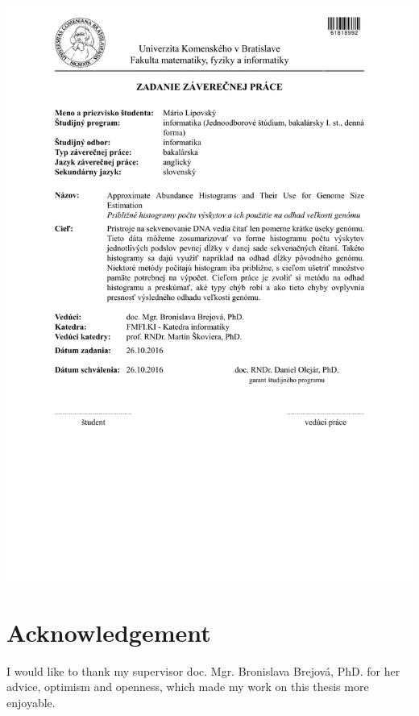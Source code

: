 \documentclass[12pt, oneside]{book}
\begin{document}
\newpage 
\thispagestyle{empty}
\hspace{-3.5cm}\includegraphics[width=1.3\textwidth]{images/zadanie-sj}


\frontmatter

\setcounter{page}{3}
\newpage 
\chapter*{Acknowledgement}

I would like to thank my supervisor doc. Mgr. Bronislava Brejová, PhD.
for her advice, optimism and openness, which made my work on this thesis more enjoyable.


\newpage 
\end{document}
